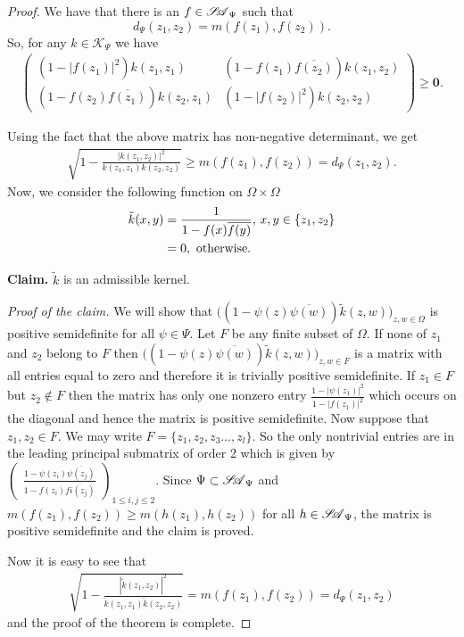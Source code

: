 \documentclass[12pt]{amsart}
\theoremstyle{definition}
\numberwithin{equation}{section}
\newcommand{\SA}{\mathscr{S\mspace{-5mu}A}}
\begin{document}
\begin{proof}
	We have that there is an $f\in \SA_\Psi$ such that $$d_\Psi (z_1,z_2)=m(f(z_1), f(z_2)).$$
	So, for any $k\in \mathcal{K}_\Psi$ we have
	\begin{align*}\begin{pmatrix}
			(1-|f(z_1)|^2)k(z_1,z_1)& (1- f(z_1) \overline{f(z_2)})k(z_1,z_2)\\
			(1- f(z_2) \overline{f(z_1)})k(z_2,z_1)& 	(1-|f(z_2)|^2)k(z_2,z_2)
		\end{pmatrix} \geq \mathbf{0}.
	\end{align*} 
	
	Using the fact that the above matrix has non-negative determinant, we get 
	\begin{align*}
		\sqrt{1-\frac{|k(z_1, z_2)|^2}{k(z_1,z_1)k(z_2,z_2)}}\geq m(f(z_1), f(z_2))=d_\Psi (z_1,z_2).
	\end{align*}
	Now, we consider the following function on $\Omega\times\Omega$
	\begin{align}\label{kernel_associated_to_function}
		\tilde{k}(x,y)&=\frac{1}{1- f(x)\overline{f(y)}},\,x,y\in\{z_1,z_2\}\\
		&=0,\,\,\text{otherwise}.\notag
	\end{align}
	
	\textbf{Claim.} $\tilde{k}$ is an admissible kernel.
	
	\textit{Proof of the claim.} We will show that $\big((1-\psi(z)\overline{\psi(w)})\tilde{k}(z,w)\big)_{z,w\in \Omega}$ is positive semidefinite for all $\psi\in\Psi$. Let $F$ be any finite subset of $\Omega$. If none of $z_1$ and $z_2$ belong to $F$ then $\big((1-\psi(z)\overline{\psi(w)})\tilde{k}(z,w)\big)_{z,w\in F}$ is a matrix with all entries equal to zero and therefore it is trivially positive semidefinite. If $z_1\in F$ but $z_2\notin F$ then the matrix has only one nonzero entry $\frac{1-|\psi(z_1)|^2}{1-|f(z_1)|^2}$ which occurs on the diagonal and hence the matrix is positive semidefinite. Now suppose that $z_1,z_2\in F$. We may write $F=\{z_1,z_2,z_3\ldots,z_l\}$. So the only nontrivial entries are in the leading principal submatrix of order 2 which is given by $\begin{pmatrix}
		\frac{1-\psi(z_i)\overline{\psi(z_j)}}{1-f(z_i)\overline{fi(z_j)}}
	\end{pmatrix}_{1\leq i,j\leq 2}.$ Since $\Psi\subset \SA_\Psi$ and $m(f(z_1),f(z_2))\geq m(h(z_1),h(z_2))$ for all $h \in \SA_\Psi$, the matrix is positive semidefinite and the claim is proved.
	
	
	Now it is easy to see that
	\begin{align*}
		\sqrt{1-\frac{|\tilde{k}(z_1, z_2)|^2}{\tilde{k}(z_1,z_1)\tilde{k}(z_2,z_2)}}=m(f(z_1), f(z_2))=d_\Psi (z_1,z_2)
	\end{align*}
	and the proof of the theorem is complete.
\end{proof}
\end{document}
